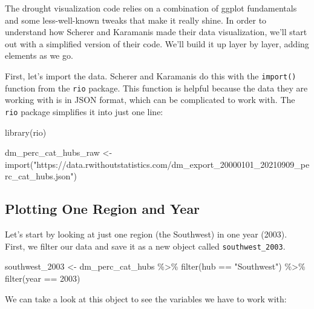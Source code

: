 \documentclass[
]{book}
\newenvironment{Shaded}{\begin{snugshade}}{\end{snugshade}}
\newcommand{\DecValTok}[1]{\textcolor[rgb]{0.00,0.00,0.81}{#1}}
\newcommand{\FunctionTok}[1]{\textcolor[rgb]{0.00,0.00,0.00}{#1}}
\newcommand{\NormalTok}[1]{#1}
\newcommand{\OtherTok}[1]{\textcolor[rgb]{0.56,0.35,0.01}{#1}}
\newcommand{\SpecialCharTok}[1]{\textcolor[rgb]{0.00,0.00,0.00}{#1}}
\newcommand{\StringTok}[1]{\textcolor[rgb]{0.31,0.60,0.02}{#1}}
\begin{document}
The drought visualization code relies on a combination of ggplot fundamentals and some less-well-known tweaks that make it really shine. In order to understand how Scherer and Karamanis made their data visualization, we'll start out with a simplified version of their code. We'll build it up layer by layer, adding elements as we go.

First, let's import the data. Scherer and Karamanis do this with the \texttt{import()} function from the \texttt{rio} package. This function is helpful because the data they are working with is in JSON format, which can be complicated to work with. The \texttt{rio} package simplifies it into just one line:

\begin{Shaded}
\begin{Highlighting}[]
\FunctionTok{library}\NormalTok{(rio)}

\NormalTok{dm\_perc\_cat\_hubs\_raw }\OtherTok{\textless{}{-}} \FunctionTok{import}\NormalTok{(}\StringTok{"https://data.rwithoutstatistics.com/dm\_export\_20000101\_20210909\_perc\_cat\_hubs.json"}\NormalTok{)}
\end{Highlighting}
\end{Shaded}

\hypertarget{plotting-one-region-and-year}{%
\subsection*{Plotting One Region and Year}\label{plotting-one-region-and-year}}

Let's start by looking at just one region (the Southwest) in one year (2003). First, we filter our data and save it as a new object called \texttt{southwest\_2003}.

\begin{Shaded}
\begin{Highlighting}[]
\NormalTok{southwest\_2003 }\OtherTok{\textless{}{-}}\NormalTok{ dm\_perc\_cat\_hubs }\SpecialCharTok{\%\textgreater{}\%}
  \FunctionTok{filter}\NormalTok{(hub }\SpecialCharTok{==} \StringTok{"Southwest"}\NormalTok{) }\SpecialCharTok{\%\textgreater{}\%}
  \FunctionTok{filter}\NormalTok{(year }\SpecialCharTok{==} \DecValTok{2003}\NormalTok{)}
\end{Highlighting}
\end{Shaded}

We can take a look at this object to see the variables we have to work with:
\end{document}
